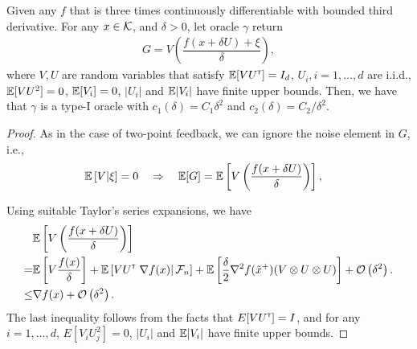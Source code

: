 \begin{proposition}
\label{prop:grad-1spsa}
Given any $f$ that is three times continuously differentiable with bounded third derivative. 
For any $x \in \mathcal{K}$, and $\delta >0$, let oracle $\gamma$ return 
\begin{align}
G =  V \left(\dfrac{f(x+\delta U) + \xi}{\delta}\right),
 \label{eq:onesp}
\end{align}
where $V, U$ are random variables that satisfy $\mathbb{E}[V U^\mathsf{\scriptscriptstyle T}] = I_d$, $U_i, i=1,\ldots,d$ are i.i.d., $\mathbb{E}[ V U^2] = 0$, $\mathbb{E}[V_i]=0$, $|U_i|$ and $\mathbb{E}|V_i|$ have finite upper bounds. 
Then, we have that $\gamma$ is a type-I oracle with $c_1(\delta) = C_1 \delta^2$ and $c_2(\delta) = C_2/\delta^2$.
\end{proposition}
\fi
\begin{proof}
As in the case of two-point feedback, we can ignore the noise element in $G$, i.e.,
\begin{align*}
&\mathbb{E}\left[  V \vert \xi \right]= 0 \quad \Rightarrow \quad
\mathbb{E}[G] =  \mathbb{E}\left[ V \left(\dfrac{f(x+\delta U) }{\delta}\right)\right],
\end{align*}

Using suitable Taylor's series expansions, we have %
\begin{align}
&\mathbb{E}\left[V\left(\dfrac{f(x+\delta U)}{\delta}\right) \right] \nonumber\\
= & \mathbb{E}\left[V \dfrac{f(x)}{\delta} \right] + \mathbb{E}\left[V U^\mathsf{\scriptscriptstyle T} \left.\nabla f(x)\right| \mathcal{F}_n\right]  +   \mathbb{E}\left[\frac{\delta}{2}  \nabla^2 f(\tilde  x^+)(V \otimes U \otimes U)\right] + \mathcal{O}\left( \delta^2\right). \label{eq:l1}\\
\le & \nabla f(x) + \mathcal{O}\left( \delta^2\right).\label{eq:l2}
\end{align}
The last inequality follows from the facts that $E[V U^\mathsf{\scriptscriptstyle T}] = I$, and for any $i=1,\ldots,d$, $E[V_i U_j^2] = 0$, $|U_i|$ and $\mathbb{E}|V_i|$ have finite upper bounds.
\end{proof}

